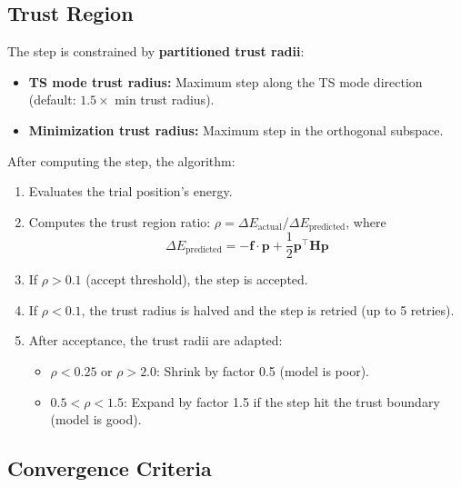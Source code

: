 \documentclass[11pt,a4paper]{article}
\begin{document}
\subsection{Trust Region}

The step is constrained by \textbf{partitioned trust radii}:
\begin{itemize}
    \item \textbf{TS mode trust radius:} Maximum step along the TS mode direction (default: $1.5 \times$ min trust radius).
    \item \textbf{Minimization trust radius:} Maximum step in the orthogonal subspace.
\end{itemize}

After computing the step, the algorithm:
\begin{enumerate}
    \item Evaluates the trial position's energy.
    \item Computes the trust region ratio: $\rho = \Delta E_\text{actual} / \Delta E_\text{predicted}$, where
    \begin{equation}
        \Delta E_\text{predicted} = -\mathbf{f} \cdot \mathbf{p} + \frac{1}{2} \mathbf{p}^\top \mathbf{H} \mathbf{p}
    \end{equation}
    \item If $\rho > 0.1$ (accept threshold), the step is accepted.
    \item If $\rho < 0.1$, the trust radius is halved and the step is retried (up to 5 retries).
    \item After acceptance, the trust radii are adapted:
    \begin{itemize}
        \item $\rho < 0.25$ or $\rho > 2.0$: Shrink by factor 0.5 (model is poor).
        \item $0.5 < \rho < 1.5$: Expand by factor 1.5 if the step hit the trust boundary (model is good).
    \end{itemize}
\end{enumerate}

\subsection{Convergence Criteria}
\end{document}
